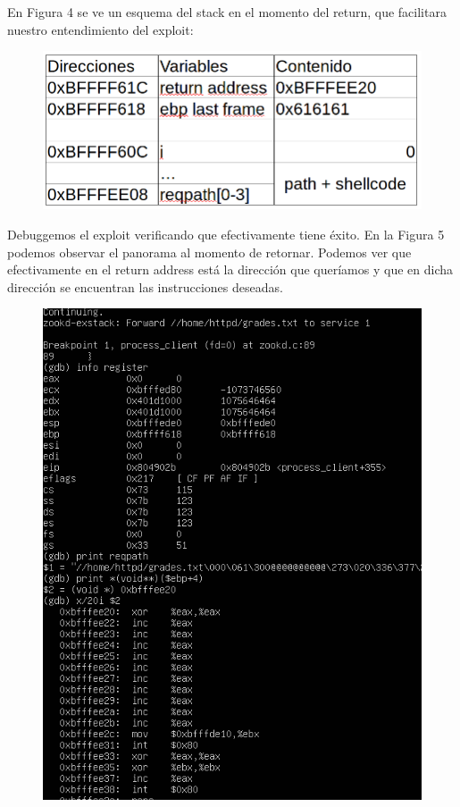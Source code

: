 \documentclass[12pt]{article}
\begin{document}
En Figura 4 se ve un esquema del stack en el momento del return, que facilitara nuestro entendimiento del exploit: \\

\begin{figure}[htp]
\centering
\includegraphics[scale=0.4]{./imagenes/esquema1.png} \\
\caption{}
\end{figure}


Debuggemos el exploit verificando que efectivamente tiene éxito. En la Figura 5 podemos observar el panorama al momento de retornar. Podemos ver que efectivamente en el return address está la dirección que queríamos y que en dicha dirección se encuentran las instrucciones deseadas. 

\begin{figure}[htp]
\centering
\includegraphics[scale=0.7]{./imagenes/ex1p.png}
\caption{}
\end{figure}
\end{document}
